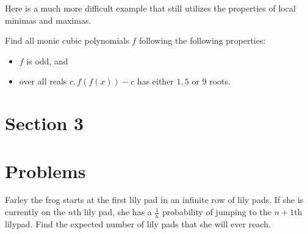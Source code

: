 \documentclass{article}
\begin{document}
Here is a much more difficult example that still utilizes the properties of local minimas and maximas.
\begin{exam}
Find all monic cubic polynomials $f$ following the following properties:
\begin{itemize}
\item $f$ is odd, and
\item over all reals $c, f(f(x))-c$ has either $1, 5$ or $9$ roots.
\end{itemize}
\end{exam}
\begin{walk}
\end{walk}
\section{Section 3}
\section{Problems}
\noindent{}

\begin{prob}[SMT 2021]{2}
Farley the frog starts at the first lily pad in an infinite row of lily pads. If she is currently on the $n$th lily pad, she has a $\frac{1}{n}$ probability of jumping to the $n+1$th lilypad. Find the expected number of lily pads that she will ever reach.
\end{prob}
\end{document}
